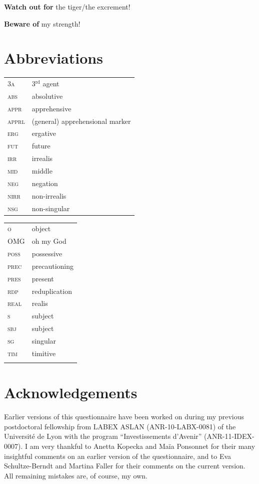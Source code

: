 \documentclass[output=paper,colorlinks,citecolor=brown]{langscibook}
\begin{document}
\ea \label{p76} \textbf{Watch out for} the tiger\textnormal{/}the excrement!
\z

\ea \label{p77} \textbf{Beware of} my strength!
\z

\section*{Abbreviations}
\begin{tabularx}{.5\textwidth}{@{}lQ@{}}
\textsc{3a} & 3$\mathrm{^{rd}}$ agent \\
\textsc{abs} & absolutive \\
\textsc{appr} & apprehensive \\
\textsc{apprl} & (general) apprehensional marker \\
\textsc{erg} & ergative \\
\textsc{fut} & future \\
\textsc{irr} & irrealis \\
\textsc{mid} & middle \\
\textsc{neg} & negation \\
\textsc{nirr} & non-irrealis \\
\textsc{nsg} & non-singular \end{tabularx}%
\begin{tabularx}{.5\textwidth}{@{}lQ@{}}
\textsc{o} & object \\
\textsc{OMG} & oh my God \\
\textsc{poss} & possessive \\
\textsc{prec} & precautioning \\
\textsc{pres} & present \\
\textsc{rdp} & reduplication \\
\textsc{real} & realis \\
\textsc{s} & subject \\
\textsc{sbj} & subject \\
\textsc{sg} & singular \\
\textsc{tim} & timitive \\\\
\end{tabularx}


\section*{Acknowledgements}
Earlier versions of this questionnaire have been worked on during my previous postdoctoral fellowship from LABEX ASLAN (ANR-10-LABX-0081) of the Université de Lyon with the program ``Investissements d'Avenir'' (ANR-11-IDEX-0007). I am very thankful  to Anetta Kopecka and Maïa Ponsonnet for their many insightful comments on an earlier version of the questionnaire, and to Eva Schultze-Berndt and Martina Faller for their comments on the current version. All remaining mistakes are, of course, my own.

\printbibliography[heading=subbibliography,notkeyword=this]
\end{document}
